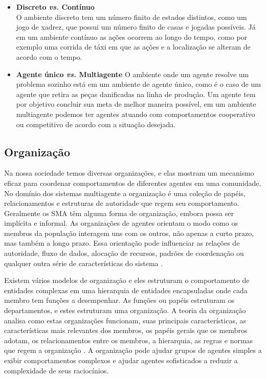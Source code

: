 \begin{itemize}
\item \textbf{Discreto \textit{vs.} Contínuo} \\
O ambiente discreto tem um número finito de estados distintos, como um jogo de xadrez, que possui um número finito de casas e jogadas possíveis. Já em um ambiente contínuo as ações ocorrem ao longo do tempo, como por exemplo uma corrida de táxi em que as ações e a localização se alteram de acordo com o tempo.

\item \textbf{Agente único \textit{vs.} Multiagente}
O ambiente onde um agente resolve um problema sozinho está em um ambiente de agente único, como é o caso de um  agente que retira as peças danificadas na linha de produção. Um agente tem por objetivo concluir sua meta de melhor maneira possível, em um ambiente multiagente podemos ter agentes atuando com comportamentos cooperativo ou competitivo de acordo com a situação desejada.
\end{itemize}

\subsection{Organização}\label{sec:orgsma}

Na nossa sociedade temos diversas organizações, e elas mostram um mecanismo eficaz para coordenar comportamentos de diferentes agentes em uma comunidade. No domínio dos sistemas multiagente a organização é uma coleção de papéis, relacionamentos e estruturas de autoridade que regem seu comportamento. Geralmente os SMA têm alguma forma de organização, embora possa ser implícita e informal. As organizações de agentes orientam o modo como os membros da população interagem uns com os outros, não apenas a curto prazo, mas também a longo prazo. Essa orientação pode influenciar as relações de autoridade, fluxo de dados, alocação de recursos, padrões de coordenação ou qualquer outra série de características do sistema \cite{horling2004survey}.

Existem vários modelos de organização e eles estruturam o comportamento de entidades complexas em uma hierarquia de entidades encapsuladas onde cada membro tem funções a desempenhar. As funções ou papéis estruturam os departamentos, e estes estruturam uma organização. A teoria da organização analisa como estas organizações funcionam, suas principais características, as características mais relevantes dos membros, os papéis gerais que os membros adotam, os relacionamentos entre os membros, a hierarquia, as regras e normas que regem a organização \cite{argente2006multi}. A organização pode ajudar grupos de agentes simples a exibir comportamentos complexos e ajudar agentes sofisticados a reduzir a complexidade de seus raciocínios.

